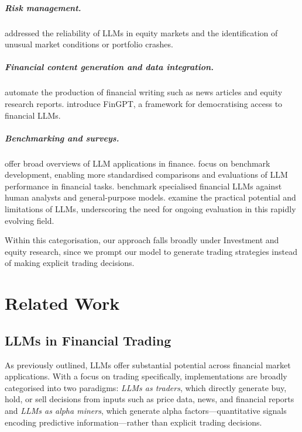 \documentclass[12pt, a4paper]{report}
\begin{document}
\paragraph{Risk management.}
\cite{park2024,koa2024temporal} addressed the reliability of LLMs in equity markets and the identification of
unusual market conditions or portfolio crashes.

\paragraph{Financial content generation and data integration.}
\cite{nishida2025,pop2024} automate the production of financial writing such as news articles
and equity research reports.
\cite{liu2023fingpt} introduce FinGPT, a framework for democratising access to financial LLMs.

\paragraph{Benchmarking and surveys.}
\cite{zhao2024llmsurvey,nie2024survey,ding2024survey}
offer broad overviews of LLM applications in finance.
\cite{li2024investorbench,mateega2025} focus on benchmark development, enabling
more standardised comparisons and evaluations of LLM performance in financial tasks.
\cite{abdelsamie2024} benchmark specialised financial LLMs against human analysts and
general-purpose models.
\cite{bi2024,chiang2025} examine the practical potential and limitations of LLMs,
underscoring the need for ongoing evaluation in this rapidly evolving field.

Within this categorisation, our approach falls broadly under Investment and equity research, since we prompt our model to generate trading strategies instead of making explicit trading decisions.

\chapter{Related Work}
\label{ch:related}

\section{LLMs in Financial Trading}
\label{sec:llm-trading}

As previously outlined, LLMs offer substantial potential across financial market applications. With
a focus on trading specifically, implementations are broadly categorised \cite{ding2024survey}
into two paradigms: \emph{LLMs as traders}, which directly generate buy, hold, or sell
decisions from inputs such as price data, news, and financial reports and \emph{LLMs as alpha miners}, which generate alpha
factors---quantitative signals encoding predictive information---rather than explicit trading decisions.
\end{document}
